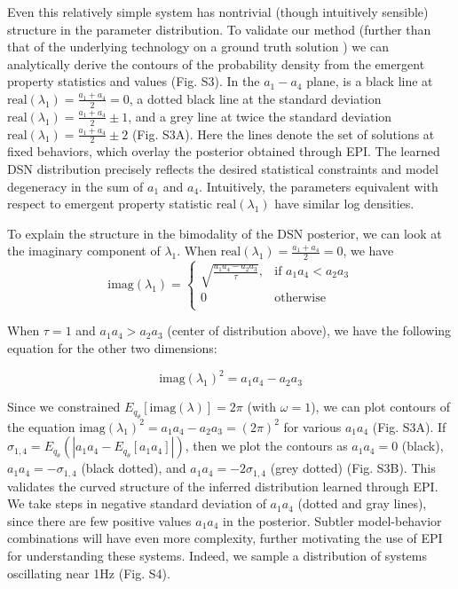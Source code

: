 \documentclass[11pt]{article}
\begin{document}
Even this relatively simple system has nontrivial (though intuitively sensible) structure in the parameter distribution.  To validate our method (further than that of the underlying technology on a ground truth solution \cite{loaiza2017maximum}) we can analytically derive the contours of the probability density from the emergent property statistics and values (Fig. S3).  In the $a_1-a_4$ plane, is a black line at $\text{real}(\lambda_1) = \frac{a_1 + a_4}{2} = 0$, a dotted black line at
the standard deviation $\text{real}(\lambda_1) = \frac{a_1 + a_4}{2} \pm 1$, and a grey line at twice the standard deviation
$\text{real}(\lambda_1) = \frac{a_1 + a_4}{2} \pm 2$ (Fig. S3A). Here the lines denote the set of solutions at fixed behaviors, which overlay the posterior obtained through EPI.  The learned DSN distribution precisely reflects the desired statistical constraints and model degeneracy in the sum of
$a_1$ and $a_4$. Intuitively, the parameters equivalent with respect to emergent property statistic $\text{real}(\lambda_1)$ have similar log densities.

To explain the structure in the bimodality of the DSN posterior, we can look at the imaginary component of $\lambda_1$.  When $\text{real}(\lambda_1) = \frac{a_1 + a_4}{2} = 0$, we have
\begin{equation}
\text{imag}(\lambda_1) = \begin{cases}
                             \sqrt{\frac{a_1 a_4 - a_2 a_3}{\tau}},  & \text{if } a_1 a_4 < a_2 a_3 \\
                             0 & \text{otherwise } \\
                         \end{cases} 
\end{equation}

When $\tau=1$ and $a_1 a_4 > a_2 a_3$ (center of distribution above), we have the following equation for the other two dimensions:

\begin{equation}
\text{imag}(\lambda_1)^2 = a_1 a_4 - a_2 a_3
\end{equation}

Since we constrained $E_{q_\theta}\left[\text{imag}(\lambda)\right] = 2 \pi$ (with $\omega=1$), we can plot contours of the equation $\text{imag}(\lambda_1)^2 = a_1 a_4 - a_2 a_3 = (2 \pi)^2$ for various $a_1 a_4$ (Fig. S3A). If $\sigma_{1,4} = E_{q_\theta}(|a_1 a_4 - E_{q_\theta}[a_1 a_4]|)$, then we plot the contours as $a_1 a_4 = 0$ (black), $a_1 a_4 = -\sigma_{1,4}$ (black dotted), and $a_1 a_4 = -2\sigma_{1,4}$ (grey dotted) (Fig. S3B). This validates the curved structure of the inferred distribution learned through EPI.  We take steps in negative standard deviation of $a_1 a_4$ (dotted and gray lines), since there are few positive values $a_1 a_4$ in the posterior.  Subtler model-behavior combinations will have even more complexity, further motivating the use of EPI for understanding these systems.  Indeed, we sample a distribution of systems oscillating near 1Hz (Fig. S4).
\end{document}
